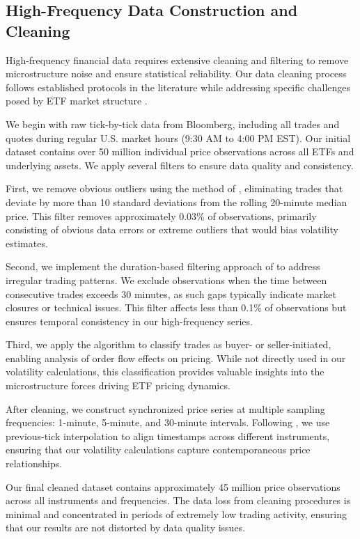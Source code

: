 \subsection{High-Frequency Data Construction and Cleaning}

High-frequency financial data requires extensive cleaning and filtering to remove microstructure noise and ensure statistical reliability. Our data cleaning process follows established protocols in the literature while addressing specific challenges posed by ETF market structure \citep{barndorff2009realized}.

We begin with raw tick-by-tick data from Bloomberg, including all trades and quotes during regular U.S. market hours (9:30 AM to 4:00 PM EST). Our initial dataset contains over 50 million individual price observations across all ETFs and underlying assets. We apply several filters to ensure data quality and consistency.

First, we remove obvious outliers using the method of \citet{brownlees2014practical}, eliminating trades that deviate by more than 10 standard deviations from the rolling 20-minute median price. This filter removes approximately 0.03\% of observations, primarily consisting of obvious data errors or extreme outliers that would bias volatility estimates.

Second, we implement the duration-based filtering approach of \citet{hansen2005realized} to address irregular trading patterns. We exclude observations when the time between consecutive trades exceeds 30 minutes, as such gaps typically indicate market closures or technical issues. This filter affects less than 0.1\% of observations but ensures temporal consistency in our high-frequency series.

Third, we apply the \citet{lee1991inferring} algorithm to classify trades as buyer- or seller-initiated, enabling analysis of order flow effects on pricing. While not directly used in our volatility calculations, this classification provides valuable insights into the microstructure forces driving ETF pricing dynamics.

After cleaning, we construct synchronized price series at multiple sampling frequencies: 1-minute, 5-minute, and 30-minute intervals. Following \citet{andersen2001distribution}, we use previous-tick interpolation to align timestamps across different instruments, ensuring that our volatility calculations capture contemporaneous price relationships.

Our final cleaned dataset contains approximately 45 million price observations across all instruments and frequencies. The data loss from cleaning procedures is minimal and concentrated in periods of extremely low trading activity, ensuring that our results are not distorted by data quality issues.

